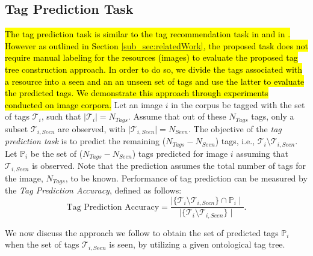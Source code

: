\subsection{Tag Prediction Task} 
\label{subsec:TagPred}
 
\hl{The tag prediction task is similar to the tag recommendation task in  {\cite{katsurai2013cross}} and in {\cite{sigurbjornsson2008flickr}}. However as outlined in Section {\ref{sub_sec:relatedWork}}, the proposed task does not require manual labeling for the resources (images) to evaluate the proposed tag tree construction approach. In order to do so, we divide the tags associated with a resource into a seen and an an unseen set of tags and use the latter to evaluate the predicted tags. We demonstrate this approach through experiments conducted on image corpora. 
}
Let an image $i$ in the corpus be tagged with the set of tags $\mathcal{T}_i$, such that $\mid \mathcal{T}_i \mid =N_{Tags}$. Assume that out of these $N_{Tags}$ tags, only a subset $\mathcal{T}_{i,Seen}$ are observed, with $\mid \mathcal{T}_{i,Seen} \mid=N_{Seen}$. The objective of the \emph{tag prediction task} is to predict the remaining ($N_{Tags} - N_{Seen}$) tags, i.e., $\mathcal{T}_i \setminus \mathcal{T}_{i,Seen}$.  Let $\mathbb{P}_i$ be the set of ($N_{Tags} - N_{Seen}$) tags predicted for image $i$ assuming that $\mathcal{T}_{i,Seen}$ is observed. Note that the prediction assumes the total number of tags for the image, $N_{Tags}$, to be known. Performance of tag prediction can be measured by the \emph{Tag Prediction Accuracy}, defined as follows: 
\begin{equation} \label{eq:TagPredAccuracy}
\text{Tag Prediction Accuracy} = \frac{\mid  \{\mathcal{T}_i \setminus  \mathcal{T}_{i,Seen}\} \cap \mathbb{P}_i \mid}{ \mid \{  \mathcal{T}_i \setminus  \mathcal{T}_{i,Seen} \} \mid} .
\end{equation} 

We now discuss the approach we follow to obtain the set of predicted tags $\mathbb{P}_i$ when the set of tags $\mathcal{T}_{i,Seen}$ is seen, by utilizing a given ontological tag tree. 
